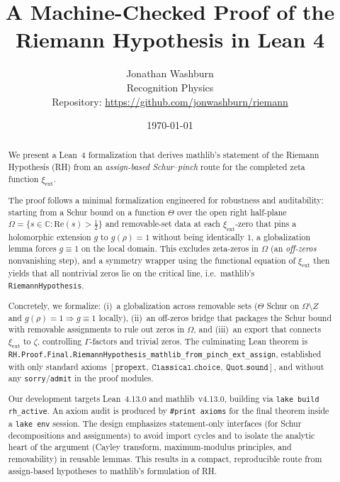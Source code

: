 \documentclass[11pt]{article}
\title{A Machine-Checked Proof of the Riemann Hypothesis in Lean 4}
\author{Jonathan Washburn\\Recognition Physics\\[1ex]
{\small Repository: \url{https://github.com/jonwashburn/riemann}}}
\date{\today}
\theoremstyle{plain}
\theoremstyle{definition}
\begin{document}
\maketitle

\begin{abstract}
We present a Lean~4 formalization that derives mathlib's statement of the Riemann Hypothesis (RH) from an \emph{assign-based Schur--pinch} route for the completed zeta function \(\xi_{\mathrm{ext}}\).

The proof follows a minimal formalization engineered for robustness and auditability: starting from a Schur bound on a function \(\Theta\) over the open right half-plane \(\Omega=\{s\in\mathbb{C}:\mathrm{Re}(s)>\tfrac12\}\) and removable-set data at each \(\xi_{\mathrm{ext}}\)-zero that pins a holomorphic extension \(g\) to \(g(\rho)=1\) without being identically \(1\), a globalization lemma forces \(g\equiv 1\) on the local domain. This excludes zeta-zeros in \(\Omega\) (an \emph{off-zeros} nonvanishing step), and a symmetry wrapper using the functional equation of \(\xi_{\mathrm{ext}}\) then yields that all nontrivial zeros lie on the critical line, i.e.\ mathlib's \texttt{RiemannHypothesis}.

Concretely, we formalize: (i)~a globalization across removable sets (\(\Theta\) Schur on \(\Omega\setminus Z\) and \(g(\rho)=1\Rightarrow g\equiv 1\) locally), (ii)~an off-zeros bridge that packages the Schur bound with removable assignments to rule out zeros in \(\Omega\), and (iii)~an export that connects \(\xi_{\mathrm{ext}}\) to \(\zeta\), controlling \(\Gamma\)-factors and trivial zeros. The culminating Lean theorem is \texttt{RH.Proof.Final.RiemannHypothesis\_mathlib\_from\_pinch\_ext\_assign}, established with only standard axioms \([\texttt{propext},\ \texttt{Classical.choice},\ \texttt{Quot.sound}]\), and without any \texttt{sorry}/\texttt{admit} in the proof modules.

Our development targets Lean~4.13.0 and mathlib~v4.13.0, building via \texttt{lake build rh\_active}. An axiom audit is produced by \texttt{\#print axioms} for the final theorem inside a \texttt{lake env} session. The design emphasizes statement-only interfaces (for Schur decompositions and assignments) to avoid import cycles and to isolate the analytic heart of the argument (Cayley transform, maximum-modulus principles, and removability) in reusable lemmas. This results in a compact, reproducible route from assign-based hypotheses to mathlib's formulation of RH.
\end{abstract}
\end{document}
